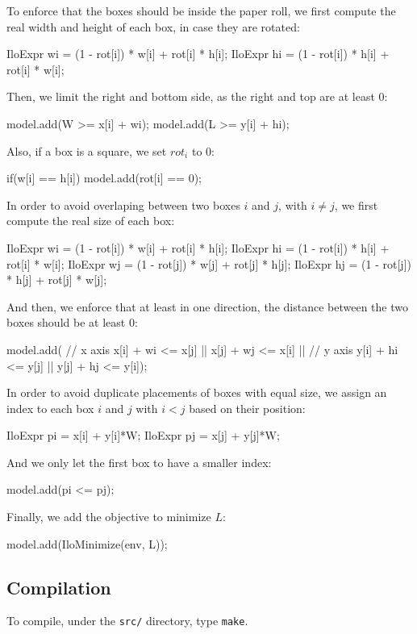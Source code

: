\documentclass[a4paper]{article}
\begin{document}
To enforce that the boxes should be inside the paper roll, we first compute the 
real width and height of each box, in case they are rotated:
%
\begin{cppcode}
IloExpr wi = (1 - rot[i]) * w[i] + rot[i] * h[i];
IloExpr hi = (1 - rot[i]) * h[i] + rot[i] * w[i];
\end{cppcode}
%
Then, we limit the right and bottom side, as the right and top are at least 0:
%
\begin{cppcode}
model.add(W >= x[i] + wi);
model.add(L >= y[i] + hi);
\end{cppcode}
%
Also, if a box is a square, we set $rot_i$ to 0:
%
\begin{cppcode}
if(w[i] == h[i]) model.add(rot[i] == 0);
\end{cppcode}
%
In order to avoid overlaping between two boxes $i$ and $j$, with $i \neq j$, we 
first compute the real size of each box:
%
\begin{cppcode}
IloExpr wi = (1 - rot[i]) * w[i] + rot[i] * h[i];
IloExpr hi = (1 - rot[i]) * h[i] + rot[i] * w[i];
IloExpr wj = (1 - rot[j]) * w[j] + rot[j] * h[j];
IloExpr hj = (1 - rot[j]) * h[j] + rot[j] * w[j];
\end{cppcode}
%
And then, we enforce that at least in one direction, the distance between the 
two boxes should be at least 0:
%
\begin{cppcode}
model.add(
		// x axis
		x[i] + wi <= x[j] || 
		x[j] + wj <= x[i] ||
		// y axis
		y[i] + hi <= y[j] ||
		y[j] + hj <= y[i]);
\end{cppcode}
%
In order to avoid duplicate placements of boxes with equal size, we assign an 
index to each box $i$ and $j$ with $i < j$ based on their position:
%
\begin{cppcode}
IloExpr pi = x[i] + y[i]*W;
IloExpr pj = x[j] + y[j]*W;
\end{cppcode}
%
And we only let the first box to have a smaller index:
%
\begin{cppcode}
model.add(pi <= pj);
\end{cppcode}
%
Finally, we add the objective to minimize $L$:
%
\begin{cppcode}
model.add(IloMinimize(env, L));
\end{cppcode}

\subsection{Compilation}

To compile, under the \texttt{src/} directory, type \texttt{make}.
\end{document}
